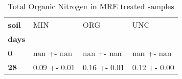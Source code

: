 \begin{table}
\centering
\caption{Total Organic Nitrogen in MRE treated samples}
\label{<built-in method lower of str object at 0x7f389ecd0f80>_treated_main}
\begin{tabular}{llll}
\toprule
\textbf{soil} &           MIN &           ORG &           UNC \\
\textbf{days} &               &               &               \\
\midrule
\textbf{0   } &    nan +- nan &    nan +- nan &    nan +- nan \\
\textbf{28  } &  0.09 +- 0.01 &  0.16 +- 0.01 &  0.12 +- 0.00 \\
\bottomrule
\end{tabular}
\end{table}
